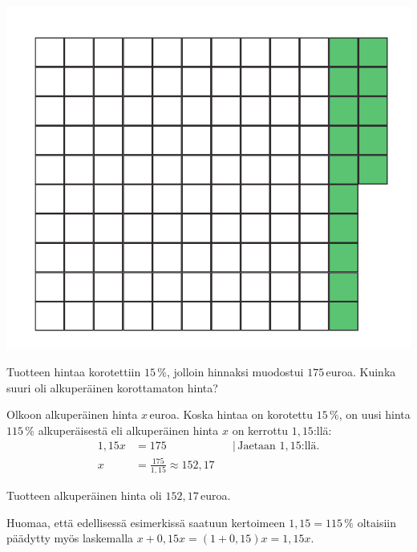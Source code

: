 \begin{esimerkki}
\begin{center}
        \includegraphics[scale=.25]{pictures/Kuva13-3-115.pdf}
    \end{center}
\end{esimerkki}

\begin{esimerkki}
Tuotteen hintaa korotettiin $15$\,\%, jolloin hinnaksi muodostui $175$\,euroa. Kuinka suuri oli alkuperäinen korottamaton hinta?
	\begin{esimratk}
Olkoon alkuperäinen hinta $x$\,euroa. Koska hintaa on korotettu $15$\,\%, on uusi hinta $115$\,\% alkuperäisestä eli alkuperäinen hinta $x$ on kerrottu $1,15$:llä:
\begin{align*}
	1,15x	&= 175	&	&|\, \text{Jaetaan } 1,15\text{:llä}.\\
	x	&= \frac{175}{1,15} \approx 152,17
\end{align*}
	\end{esimratk}
    \begin{esimvast}
    Tuotteen alkuperäinen hinta oli $152,17$\,euroa.
    \end{esimvast}
\end{esimerkki}

Huomaa, että edellisessä esimerkissä saatuun kertoimeen $1,15 = 115\,\%$ oltaisiin päädytty myös laskemalla $x + 0,15x = (1 + 0,15)x = 1,15x$.

%


